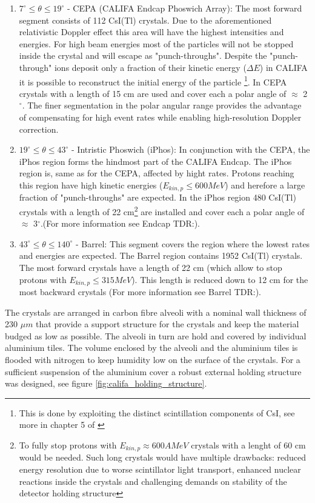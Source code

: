 \begin{enumerate}
\item[\ding{108}] $7^{\circ} \leq \theta \leq 19^{\circ}$ - CEPA (CALIFA Endcap Phoswich Array): The most forward segment consists of 112 CsI(Tl) crystals. Due to the aforementioned relativistic Doppler effect this area will have the highest intensities and energies. For high beam energies most of the particles will not be stopped inside the crystal and will escape as "punch-throughs". Despite the "punch-through" ions deposit only a fraction of their kinetic energy ($\Delta E$) in CALIFA it is possible to reconstruct the initial energy of the particle \footnote{This is done by exploiting the distinct scintillation components of CsI, see more in chapter 5 of \cite{Bendel:98055}}. In CEPA crystals with a length of 15 cm are used and cover each a polar angle of $\approx$ 2$^{\circ}$. The finer segmentation in the polar angular range provides the advantage of compensating for high event rates while enabling high-resolution Doppler correction.      
\item[\ding{108}] $19^{\circ} \leq \theta \leq 43^{\circ}$ - Intristic Phoswich (iPhos): In conjunction with the CEPA, the iPhos region forms the hindmost part of the CALIFA Endcap. The iPhos region is, same as for the CEPA, affected by hight rates. Protons reaching this region have high kinetic energies ($E_{kin,p} \leq 600 MeV$) and herefore a large fraction of "punch-throughs" are expected. In the iPhos region 480 CsI(Tl) crystals with a length of 22 cm\footnote{To fully stop protons with $E_{kin,p} \approx 600 AMeV$ crystals with a lenght of 60 cm would be needed. Such long crystals would have multiple drawbacks: reduced energy resolution due to worse scintillator light transport, enhanced nuclear reactions inside the crystals and challenging demands on stability of the detector holding structure} are installed and cover each a polar angle of $\approx$ 3$^{\circ}$.(For more information see Endcap TDR:\cite{tdr:endcap}).
\item[\ding{108}] $43^{\circ} \leq \theta \leq 140^{\circ}$ - Barrel: This segment covers the region where the lowest rates and energies are expected. The Barrel region contains 1952 CsI(Tl) crystals. The most forward crystals have a length of 22 cm (which allow to stop protons with $E_{kin,p} \leq 315 MeV$). This length is reduced down to 12 cm for the most backward crystals (For more information see Barrel TDR:\cite{tdr:barrel}).   
\end{enumerate}
The crystals are arranged in carbon fibre alveoli with a nominal wall thickness of 230 $\mu m$\cite{tdr:barrel} that provide a support structure for the crystals and keep the material budged as low as possible. The alveoli in turn are hold and covered by individual aluminium tiles. The volume enclosed by the alveoli and the aluminium tiles is flooded with nitrogen to keep humidity low on the surface of the crystals. For a sufficient suspension of the aluminium cover a robust external holding structure was designed, see figure \ref{fig:califa_holding_structure}.\newline
